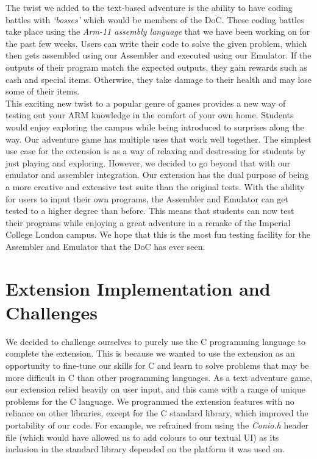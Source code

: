 \documentclass[10pt]{article}
\begin{document}
The twist we added to the text-based adventure is the ability to have coding battles with {\sl ‘bosses’} which would be members of the DoC. These coding battles take place using the {\sl Arm-11 assembly language} that we have been working on for the past few weeks. Users can write their code to solve the given problem, which then gets assembled using our Assembler and executed using our Emulator. If the outputs of their program match the expected outputs, they gain rewards such as cash and special items. Otherwise, they take damage to their health and may lose some of their items. 
\\

This exciting new twist to a popular genre of games provides a new way of testing out your ARM knowledge in the comfort of your own home. Students would enjoy exploring the campus while being introduced to surprises along the way. Our adventure game has multiple uses that work well together. The simplest use case for the extension is as a way of relaxing and destressing for students by just playing and exploring. However, we decided to go beyond that with our emulator and assembler integration. Our extension has the dual purpose of being a more creative and extensive test suite than the original tests. With the ability for users to input their own programs, the Assembler and Emulator can get tested to a higher degree than before. This means that students can now test their programs while enjoying a great adventure in a remake of the Imperial College London campus. We hope that this is the most fun testing facility for the Assembler and Emulator that the DoC has ever seen. 

\section*{Extension Implementation and Challenges}

We decided to challenge ourselves to purely use the C programming language to complete the extension. This is because we wanted to use the extension as an opportunity to fine-tune our skills for C and learn to solve problems that may be more difficult in C than other programming languages. As a text adventure game, our extension relied heavily on user input, and this came with a range of unique problems for the C language. We programmed the extension features with no reliance on other libraries, except for the C standard library, which improved the portability of our code. For example, we refrained from using the {\sl Conio.h} header file (which would have allowed us to add colours to our textual UI) as its inclusion in the standard library depended on the platform it was used on. 
\\
\end{document}
